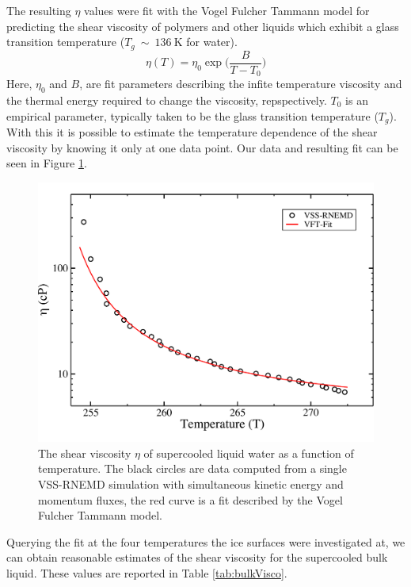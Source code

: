 The resulting $\eta$ values were fit with the Vogel Fulcher Tammann model
for predicting the shear viscosity of polymers and other liquids which
exhibit a glass transition temperature ($T_g~\sim~136~\mathrm{K}$ for
water). 
\begin{equation}\label{eq:WLF}
\eta (T) = \eta_0 \exp \Bigg({\frac{B}{T-T_0}}\Bigg)
\end{equation}
Here, $\eta_0$ and $B$, are fit parameters describing the infite
temperature viscosity and the thermal energy required to change the
viscosity, repspectively. $T_0$ is an empirical parameter, typically
taken to be the glass transition temperature ($T_g$).  With this it is
possible to estimate the temperature dependence of the shear viscosity
by knowing it only at one data point. Our data and resulting fit can
be seen in Figure \ref{fig:etaT}.
\begin{figure}
\includegraphics[width=\linewidth]{Figures/bulkVFT}
\caption{\label{fig:etaT} The shear viscosity $\eta$ of supercooled
  liquid water as a function of temperature. The black circles are
  data computed from a single VSS-RNEMD simulation with simultaneous
  kinetic energy and momentum fluxes, the red curve is a fit described
  by the Vogel Fulcher Tammann model.}
\end{figure} 
Querying the fit at the four temperatures the ice surfaces were
investigated at, we can obtain reasonable estimates of the shear
viscosity for the supercooled bulk liquid. These values are reported
in Table \ref{tab:bulkVisco}.
   


